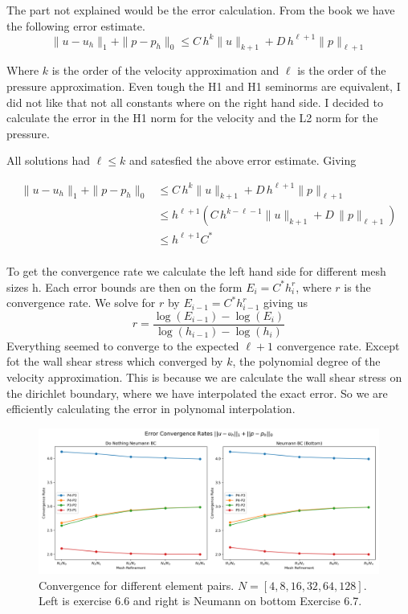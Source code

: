 \documentclass[a4paper,12pt]{article}
\theoremstyle{exerciseStyle}
\theoremstyle{solutionStyle}
\begin{document}
\begin{solution}{6.7}
    The part not explained would be the error calculation.
    From the book we have the following error estimate.
    \[
        \|u - u_h\|_1 + \|p - p_h\|_0 \le C\,h^k \|u\|_{k+1} + D\,h^{\ell+1} \|p\|_{\ell+1}
    \]

    Where \(k\) is the order of the velocity approximation and \(\ell\) is the order of the pressure approximation.
    Even tough the H1 and H1 seminorms are equivalent, I did not like that not all constants
    where on the right hand side. I decided to calculate the error in the H1 norm for the velocity and the L2 norm for the pressure.

    All solutions had \( \ell \le k\) and satesfied the above error estimate. Giving

    \begin{align*}
        \|u - u_h\|_1 + \|p - p_h\|_0 & \le C\,h^k \|u\|_{k+1} + D\,h^{\ell+1} \|p\|_{\ell+1}                               \\
                                      & \le h^{\ell+1} \left(  C\,h^{k - \ell - 1} \|u\|_{k+1} + D\, \|p\|_{\ell+1} \right) \\
                                      & \le h^{\ell+1}  C^*                                                                 \\
    \end{align*}

    To get the convergence rate we calculate the left hand side for different mesh sizes h.
    Each error bounds are then on the form \(E_i = C^* h_i^r\), where \(r\) is the convergence rate.
    We solve for \(r\) by \(E_{i-1} = C^* h_{i-1}^r\) giving us
    \[
        r = \frac{\log(E_{i-1}) - \log(E_i)}{\log(h_{i-1}) - \log(h_i)}
    \]
    Everything seemed to converge to the expected \(\ell + 1\) convergence rate. Except fot the
    wall shear stress which converged by \(k\), the polynomial degree of the velocity approximation.
    This is because we are calculate the wall shear stress on the dirichlet boundary, where we
    have interpolated the exact error. So we are efficiently calculating the error in polynomal interpolation.
\end{solution}

\begin{figure}[h]
    \centering
    \centering
    \includegraphics[width=1\linewidth]{figs/convergence_rates_subplot.png}
    \caption{Convergence for different element pairs. \( N = [4, 8, 16, 32, 64, 128] \). Left is exercise 6.6 and right is Neumann on bottom Exercise 6.7.}
    \label{fig:ex66}
\end{figure}
\end{document}
